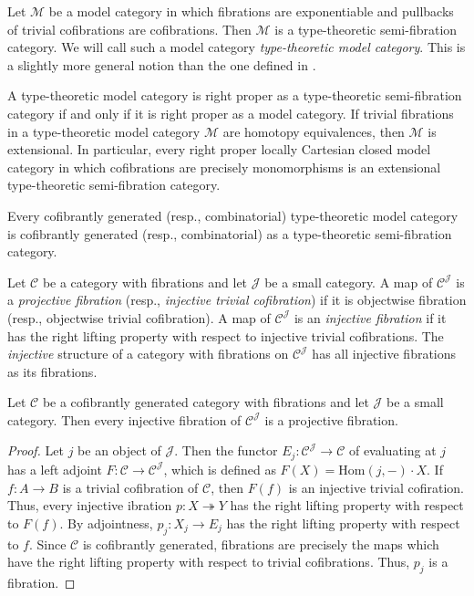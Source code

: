 \documentclass[reqno]{amsart}
\theoremstyle{definition}
\theoremstyle{remark}
\newcommand{\fs}[1]{\mathrm{#1}}
\newcommand{\scat}[1]{\mathcal{#1}}
\newcommand{\Hom}{\fs{Hom}}
\numberwithin{figure}{section}
\begin{document}
\begin{example}
Let $\scat{M}$ be a model category in which fibrations are exponentiable and pullbacks of trivial cofibrations are cofibrations.
Then $\scat{M}$ is a type-theoretic semi-fibration category.
We will call such a model category \emph{type-theoretic model category}.
This is a slightly more general notion than the one defined in \cite[Definition~2.12]{shul-inv}.

A type-theoretic model category is right proper as a type-theoretic semi-fibration category if and only if it is right proper as a model category.
If trivial fibrations in a type-theoretic model category $\scat{M}$ are homotopy equivalences, then $\scat{M}$ is extensional.
In particular, every right proper locally Cartesian closed model category in which cofibrations are precisely monomorphisms is an extensional type-theoretic semi-fibration category.

Every cofibrantly generated (resp., combinatorial) type-theoretic model category is cofibrantly generated (resp., combinatorial) as a type-theoretic semi-fibration category.
\end{example}

Let $\scat{C}$ be a category with fibrations and let $\scat{J}$ be a small category.
A map of $\scat{C}^\scat{J}$ is a \emph{projective fibration} (resp., \emph{injective trivial cofibration}) if it is objectwise fibration (resp., objectwise trivial cofibration).
A map of $\scat{C}^\scat{J}$ is an \emph{injective fibration} if it has the right lifting property with respect to injective trivial cofibrations.
The \emph{injective} structure of a category with fibrations on $\scat{C}^\scat{J}$ has all injective fibrations as its fibrations.

\begin{lem}
Let $\scat{C}$ be a cofibrantly generated category with fibrations and let $\scat{J}$ be a small category.
Then every injective fibration of $\scat{C}^\scat{J}$ is a projective fibration.
\end{lem}
\begin{proof}
Let $j$ be an object of $\scat{J}$.
Then the functor $E_j : \scat{C}^\scat{J} \to \scat{C}$ of evaluating at $j$ has a left adjoint $F : \scat{C} \to \scat{C}^\scat{J}$, which is defined as $F(X) = \Hom(j,-) \cdot X$.
If $f : A \to B$ is a trivial cofibration of $\scat{C}$, then $F(f)$ is an injective trivial cofiration.
Thus, every injective ibration $p : X \twoheadrightarrow Y$ has the right lifting property with respect to $F(f)$.
By adjointness, $p_j : X_j \to E_j$ has the right lifting property with respect to $f$.
Since $\scat{C}$ is cofibrantly generated, fibrations are precisely the maps which have the right lifting property with respect to trivial cofibrations.
Thus, $p_j$ is a fibration.
\end{proof}
\end{document}
